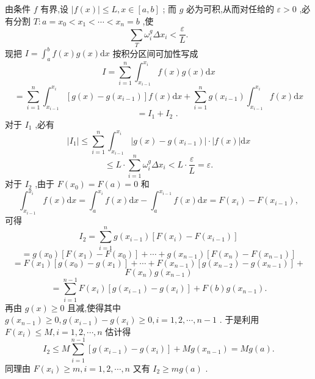 由条件 \(f\) 有界,设 \(\left| {f\left( x\right) }\right|  \leq  L,x \in  \left\lbrack  {a,b}\right\rbrack\) ; 而 \(g\) 必为可积,从而对任给的 \(\varepsilon  > 0\) ,必有分割 \(T : a = {x}_{0} < {x}_{1} < \cdots  < {x}_{n} = b\) ,使
\[
\mathop{\sum }\limits_{T}{\omega }_{i}^{g}\Delta {x}_{i} < \frac{\varepsilon }{L}.
\]
现把 \(I = {\int }_{a}^{b}f\left( x\right) g\left( x\right) \mathrm{d}x\) 按积分区间可加性写成
\[
I = \mathop{\sum }\limits_{{i = 1}}^{n}{\int }_{{x}_{i - 1}}^{{x}_{i}}f\left( x\right) g\left( x\right) \mathrm{d}x
\]
\[
= \mathop{\sum }\limits_{{i = 1}}^{n}{\int }_{{x}_{i - 1}}^{{x}_{i}}\left\lbrack  {g\left( x\right)  - g\left( {x}_{i - 1}\right) }\right\rbrack  f\left( x\right) \mathrm{d}x + \mathop{\sum }\limits_{{i = 1}}^{n}g\left( {x}_{i - 1}\right) {\int }_{{x}_{i - 1}}^{{x}_{i}}f\left( x\right) \mathrm{d}x
\]
\[
= {I}_{1} + {I}_{2}\text{ . }
\]
对于 \({I}_{1}\) ,必有
\[
\left| {I}_{1}\right|  \leq  \mathop{\sum }\limits_{{i = 1}}^{n}{\int }_{{x}_{i - 1}}^{{x}_{i}}\left| {g\left( x\right)  - g\left( {x}_{i - 1}\right) }\right|  \cdot  \left| {f\left( x\right) }\right| \mathrm{d}x
\]
\[
\leq  L \cdot  \mathop{\sum }\limits_{{i = 1}}^{n}{\omega }_{i}^{g}\Delta {x}_{i} < L \cdot  \frac{\varepsilon }{L} = \varepsilon .
\]
对于 \({I}_{2}\) ,由于 \(F\left( {x}_{0}\right)  = F\left( a\right)  = 0\) 和
\[
{\int }_{{x}_{i - 1}}^{{x}_{i}}f\left( x\right) \mathrm{d}x = {\int }_{a}^{{x}_{i}}f\left( x\right) \mathrm{d}x - {\int }_{a}^{{x}_{i - 1}}f\left( x\right) \mathrm{d}x = F\left( {x}_{i}\right)  - F\left( {x}_{i - 1}\right) ,
\]
可得
\[
{I}_{2} = \mathop{\sum }\limits_{{i = 1}}^{n}g\left( {x}_{i - 1}\right) \left\lbrack  {F\left( {x}_{i}\right)  - F\left( {x}_{i - 1}\right) }\right\rbrack
\]
\[
= g\left( {x}_{0}\right) \left\lbrack  {F\left( {x}_{1}\right)  - F\left( {x}_{0}\right) }\right\rbrack   + \cdots  + g\left( {x}_{n - 1}\right) \left\lbrack  {F\left( {x}_{n}\right)  - F\left( {x}_{n - 1}\right) }\right\rbrack
\]
\[
= F\left( {x}_{1}\right) \left\lbrack  {g\left( {x}_{0}\right)  - g\left( {x}_{1}\right) }\right\rbrack   + \cdots  + F\left( {x}_{n - 1}\right) \left\lbrack  {g\left( {x}_{n - 2}\right)  - g\left( {x}_{n - 1}\right) }\right\rbrack   +
\]
\[
F\left( {x}_{n}\right) g\left( {x}_{n - 1}\right)
\]
\[
= \mathop{\sum }\limits_{{i = 1}}^{{n - 1}}F\left( {x}_{i}\right) \left\lbrack  {g\left( {x}_{i - 1}\right)  - g\left( {x}_{i}\right) }\right\rbrack   + F\left( b\right) g\left( {x}_{n - 1}\right) .
\]
再由 \(g\left( x\right)  \geq  0\) 且减,使得其中 \(g\left( {x}_{n - 1}\right)  \geq  0,g\left( {x}_{i - 1}\right)  - g\left( {x}_{i}\right)  \geq  0,i = 1,2,\cdots ,n - 1\) . 于是利用 \(F\left( {x}_{i}\right)  \leq  M,i = 1,2,\cdots ,n\) 估计得
\[
{I}_{2} \leq  M\mathop{\sum }\limits_{{i = 1}}^{{n - 1}}\left\lbrack  {g\left( {x}_{i - 1}\right)  - g\left( {x}_{i}\right) }\right\rbrack   + {Mg}\left( {x}_{n - 1}\right)  = {Mg}\left( a\right) .
\]
同理由 \(F\left( {x}_{i}\right)  \geq  m,i = 1,2,\cdots ,n\) 又有 \({I}_{2} \geq  {mg}\left( a\right)\) .


